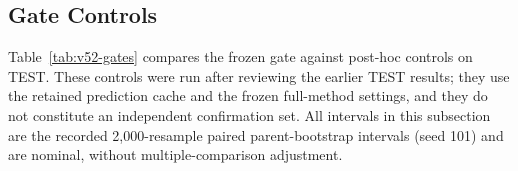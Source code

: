 \documentclass{article}
\begin{document}
\begin{table}[htbp]
  \caption{Stratum-boundary sensitivity. The no-op tolerance and the low and high boundary are
  shifted by the indicated factor of the bank threshold, and every other setting is unchanged.
  MASE is source-macro averaged within the resulting strata.}
  \label{tab:app-opp-sens}
  \centering
  \small
  \setlength{\tabcolsep}{4pt}
\end{table}

\subsection{Gate Controls}
\label{app:gate-controls}
Table~\ref{tab:v52-gates} compares the frozen gate against post-hoc controls on TEST.
These controls were run after reviewing the earlier TEST results; they use the retained
prediction cache and the frozen full-method settings, and they do not constitute an
independent confirmation set. All intervals in this subsection are the recorded
2,000-resample paired parent-bootstrap intervals (seed 101) and are nominal, without
multiple-comparison adjustment.
\end{document}
